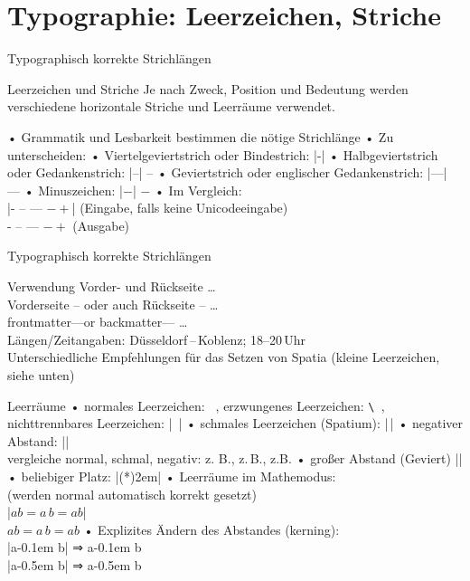 \section{Typographie: Leerzeichen, Striche}
\begin{frame}[fragile]{Typographisch korrekte Strichlängen}
\begin{block}{Leerzeichen und Striche}
Je nach Zweck, Position und Bedeutung werden verschiedene horizontale Striche und Leerräume verwendet.
\end{block}
\pause
• Grammatik und Lesbarkeit bestimmen die nötige Strichlänge
• Zu unterscheiden:
• Viertelgeviertstrich oder Bindestrich: |-|
• Halbgeviertstrich oder Gedankenstrich: |--| –
• Geviertstrich oder englischer Gedankenstrich: |---| —
• Minuszeichen: |$-$| $-$
• Im Vergleich:\huge%
\\ |- -- --- $- +$| {\normalsize (Eingabe, falls keine Unicodeeingabe)}%
\\ - – — $- +$ {\normalsize (Ausgabe)}%
\•
\end{frame}

\begin{frame}[fragile]{Typographisch korrekte Strichlängen}
\begin{block}{Verwendung}
Vorder- und Rückseite \dots\\
Vorderseite – oder auch Rückseite – \dots\\
frontmatter—or backmatter— \dots\\
Längen/Zeitangaben: Düsseldorf\,–\,Koblenz; 18–20\,Uhr\\%
Unterschiedliche Empfehlungen für das Setzen von Spatia (kleine Leerzeichen, siehe unten)
\end{block}
\end{frame}

\begin{frame}[fragile]{Leerräume}
• normales Leerzeichen: \verb*| |, erzwungenes Leerzeichen: \verb*|\ |, nichttrennbares Leerzeichen: |~|
• schmales Leerzeichen (Spatium): |\,|
• negativer Abstand: |\!|\\%
 vergleiche normal, schmal, negativ: z. B., z.\,B., z.\!B.
• großer Abstand (Geviert) |\emspace|
• beliebiger Platz: |\hspace(*){2em}|
• Leerräume im Mathemodus:%
\\ (werden normal automatisch korrekt gesetzt)%
\\ |$a b = a\, b = a \! b$|
\\ $a b = a\, b = a \! b$%
\pause
• Explizites Ändern des Abstandes (kerning):%
\\ |a\kern-0.1em b| ⇒ a\kern-0.1em b %
\\ |a\kern-0.5em b| ⇒ a\kern-0.5em b 
\• 
\end{frame}

